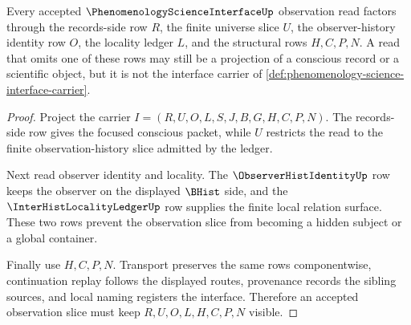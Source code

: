 \begin{theorem}
\label{thm:phenomenology-science-interface-observation-slice}
Every accepted $\PhenomenologyScienceInterfaceUp$ observation read factors through the records-side row $R$, the finite universe slice $U$, the observer-history identity row $O$, the locality ledger $L$, and the structural rows $H,C,P,N$. A read that omits one of these rows may still be a projection of a conscious record or a scientific object, but it is not the interface carrier of \autoref{def:phenomenology-science-interface-carrier}.
\end{theorem}
\begin{proof}
Project the carrier $I=(R,U,O,L,S,J,B,G,H,C,P,N)$. The records-side row gives the focused conscious packet, while $U$ restricts the read to the finite observation-history slice admitted by the ledger.

Next read observer identity and locality. The $\ObserverHistIdentityUp$ row keeps the observer on the displayed $\BHist$ side, and the $\InterHistLocalityLedgerUp$ row supplies the finite local relation surface. These two rows prevent the observation slice from becoming a hidden subject or a global container.

Finally use $H,C,P,N$. Transport preserves the same rows componentwise, continuation replay follows the displayed routes, provenance records the sibling sources, and local naming registers the interface. Therefore an accepted observation slice must keep $R,U,O,L,H,C,P,N$ visible.
\end{proof}

